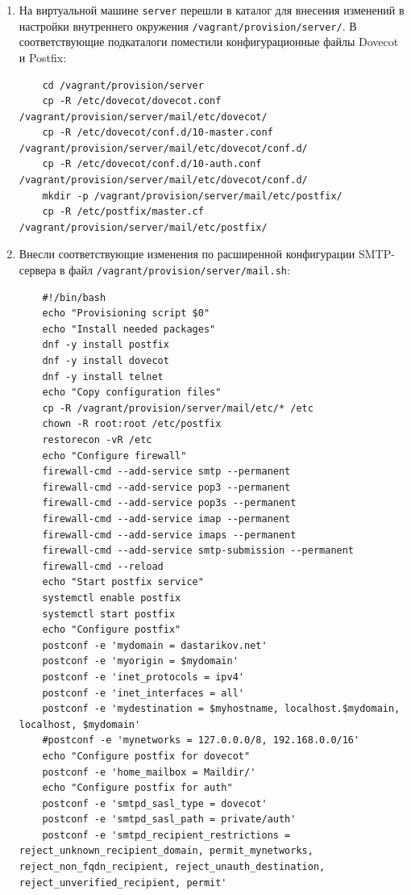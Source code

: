 \begin{enumerate}
\item На виртуальной машине \texttt{server} перешли в каталог для внесения изменений в настройки внутреннего окружения \texttt{/vagrant/provision/server/}. В соответствующие подкаталоги поместили конфигурационные файлы Dovecot и Postfix:
  \begin{verbatim}
    cd /vagrant/provision/server
    cp -R /etc/dovecot/dovecot.conf /vagrant/provision/server/mail/etc/dovecot/
    cp -R /etc/dovecot/conf.d/10-master.conf /vagrant/provision/server/mail/etc/dovecot/conf.d/
    cp -R /etc/dovecot/conf.d/10-auth.conf /vagrant/provision/server/mail/etc/dovecot/conf.d/
    mkdir -p /vagrant/provision/server/mail/etc/postfix/
    cp -R /etc/postfix/master.cf /vagrant/provision/server/mail/etc/postfix/
  \end{verbatim}
\item Внесли соответствующие изменения по расширенной конфигурации SMTP-сервера в файл \texttt{/vagrant/provision/server/mail.sh}:
  \begin{verbatim}
    #!/bin/bash
    echo "Provisioning script $0"
    echo "Install needed packages"
    dnf -y install postfix
    dnf -y install dovecot
    dnf -y install telnet
    echo "Copy configuration files"
    cp -R /vagrant/provision/server/mail/etc/* /etc
    chown -R root:root /etc/postfix
    restorecon -vR /etc
    echo "Configure firewall"
    firewall-cmd --add-service smtp --permanent
    firewall-cmd --add-service pop3 --permanent
    firewall-cmd --add-service pop3s --permanent
    firewall-cmd --add-service imap --permanent
    firewall-cmd --add-service imaps --permanent
    firewall-cmd --add-service smtp-submission --permanent
    firewall-cmd --reload
    echo "Start postfix service"
    systemctl enable postfix
    systemctl start postfix
    echo "Configure postfix"
    postconf -e 'mydomain = dastarikov.net'
    postconf -e 'myorigin = $mydomain'
    postconf -e 'inet_protocols = ipv4'
    postconf -e 'inet_interfaces = all'
    postconf -e 'mydestination = $myhostname, localhost.$mydomain, localhost, $mydomain'
    #postconf -e 'mynetworks = 127.0.0.0/8, 192.168.0.0/16'
    echo "Configure postfix for dovecot"
    postconf -e 'home_mailbox = Maildir/'
    echo "Configure postfix for auth"
    postconf -e 'smtpd_sasl_type = dovecot'
    postconf -e 'smtpd_sasl_path = private/auth'
    postconf -e 'smtpd_recipient_restrictions = reject_unknown_recipient_domain, permit_mynetworks, reject_non_fqdn_recipient, reject_unauth_destination, reject_unverified_recipient, permit'
    

\end{verbatim}
\end{enumerate}
